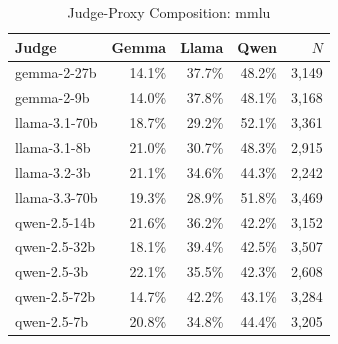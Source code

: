 \begin{table}[htbp]
\centering
\caption{Judge-Proxy Composition: mmlu}
\label{tab:composition_mmlu}
\begin{tabular}{lrrrr}
\toprule
Judge & Gemma & Llama & Qwen & $N$ \\
\midrule
gemma-2-27b & 14.1\% & 37.7\% & 48.2\% & 3,149 \\
gemma-2-9b & 14.0\% & 37.8\% & 48.1\% & 3,168 \\
llama-3.1-70b & 18.7\% & 29.2\% & 52.1\% & 3,361 \\
llama-3.1-8b & 21.0\% & 30.7\% & 48.3\% & 2,915 \\
llama-3.2-3b & 21.1\% & 34.6\% & 44.3\% & 2,242 \\
llama-3.3-70b & 19.3\% & 28.9\% & 51.8\% & 3,469 \\
qwen-2.5-14b & 21.6\% & 36.2\% & 42.2\% & 3,152 \\
qwen-2.5-32b & 18.1\% & 39.4\% & 42.5\% & 3,507 \\
qwen-2.5-3b & 22.1\% & 35.5\% & 42.3\% & 2,608 \\
qwen-2.5-72b & 14.7\% & 42.2\% & 43.1\% & 3,284 \\
qwen-2.5-7b & 20.8\% & 34.8\% & 44.4\% & 3,205 \\
\bottomrule
\end{tabular}
\end{table}